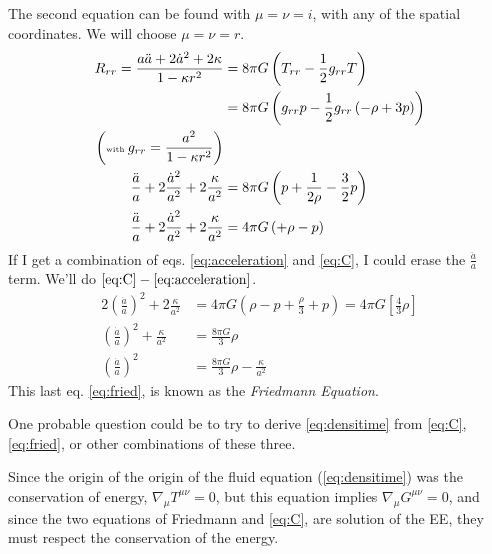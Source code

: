 The second equation can be found with $\mu  = \nu  = i$, with any of the spatial coordinates. We will choose $\mu  = \nu  = r$.
\begin{align}
	R_{rr} = \frac{a \ddot{a} + 2 \dot{a}^{2} + 2 \kappa }{1 - \kappa r^{2}} &= 8\pi G \left( T_{rr} - \frac{1}{2}g_{rr} T \right) \nonumber\\
										 &= 8\pi G \left( g_{rr}p - \frac{1}{2} g_{rr}\left( -\rho +3p \right) \right) \nonumber\\
	\left( \text{\tiny with   } g_{rr} = \frac{a^{2}}{1-\kappa r^{2}} \right) \nonumber\\
	\frac{\ddot{a}}{a} + 2 \frac{\dot{a}^{2}}{a^{2}}+ 2 \frac{\kappa }{a^{2}} &= 8\pi G \left( p + \frac{1}{2 \rho }- \frac{3}{2} p \right) \nonumber\\	
	\frac{\ddot{a}}{a} + 2 \frac{\dot{a}^{2}}{a^{2}}+ 2 \frac{\kappa }{a^{2}} &= 4\pi G\left( +\rho -p \right) \label{eq:C}
\end{align}
If I get a combination of eqs. \ref{eq:acceleration} and \ref{eq:C}, I could erase the $ \frac{\ddot{a}}{a}$ term. We'll do $\ref{eq:C} - \ref{eq:acceleration}$.
\begin{align}
	2 \left( \frac{\dot{a}}{a} \right)^{2} + 2 \frac{\kappa }{a^{2}} &= 4\pi G \left( \rho  - p + \frac{\rho }{3} +p \right) = 4\pi G \left[ \frac{4}{3}\rho  \right] \nonumber\\
	\left( \frac{\dot{a}}{a} \right)^{2} + \frac{\kappa }{a^{2}} &= \frac{8\pi G}{3}\rho  \nonumber\\
	\left( \frac{\dot{a}}{a} \right)^{2} &= \frac{8\pi G}{3}\rho - \frac{\kappa }{a^{2}}\label{eq:fried}
\end{align}
This last eq. \ref{eq:fried}, is known as the \emph{Friedmann Equation}.\par

One probable question could be to try to derive \ref{eq:densitime} from \ref{eq:C}, \ref{eq:fried}, or other combinations of these three.\par

Since the origin of the origin of the fluid equation (\ref{eq:densitime}) was the conservation of energy, $\nabla _{\mu }T^{\mu \nu }=0$, but this equation implies $\nabla _{\mu }G^{\mu \nu } = 0$, and since the two equations of Friedmann and \ref{eq:C}, are solution of the EE, they must respect the conservation of the energy.

